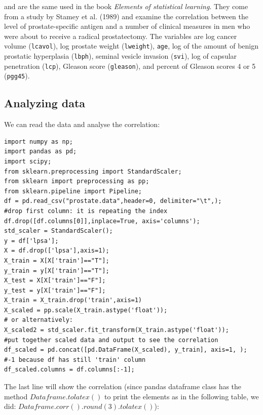 \documentclass[12pt, letterpaper]{article}
\theoremstyle{definition}
\let\ti\textit
\begin{document}
and are the same used in the book \ti{Elements of statistical learning}. They come from a study by Stamey et al. (1989) and examine the correlation between the level of prostate-specific antigen and a number of clinical measures in men who were about to receive a radical prostatectomy. The variables are log cancer volume (\lstinline[columns=fixed]{lcavol}), log prostate weight (\lstinline[columns=fixed]{lweight}), \lstinline[columns=fixed]{age}, log of the amount of benign prostatic hyperplasia (\lstinline[columns=fixed]{lbph}), seminal vesicle invasion (\lstinline[columns=fixed]{svi}), log of capsular penetration (\lstinline[columns=fixed]{lcp}), Gleason score (\lstinline[columns=fixed]{gleason}), and percent of Gleason scores 4 or 5 (\lstinline[columns=fixed]{pgg45}).

\subsection{Analyzing data}
We can read the data and analyse the correlation:

\begin{lstlisting}
import numpy as np;
import pandas as pd;
import scipy;
from sklearn.preprocessing import StandardScaler;
from sklearn import preprocessing as pp;
from sklearn.pipeline import Pipeline;
df = pd.read_csv("prostate.data",header=0, delimiter="\t",);
#drop first column: it is repeating the index
df.drop([df.columns[0]],inplace=True, axis='columns');
std_scaler = StandardScaler();
y = df['lpsa'];
X = df.drop(['lpsa'],axis=1);
X_train = X[X['train']=="T"];
y_train = y[X['train']=="T"];
X_test = X[X['train']=="F"];
y_test = y[X['train']=="F"];
X_train = X_train.drop('train',axis=1)
X_scaled = pp.scale(X_train.astype('float'));
# or alternatively:
X_scaled2 = std_scaler.fit_transform(X_train.astype('float'));
#put together scaled data and output to see the correlation
df_scaled = pd.concat([pd.DataFrame(X_scaled), y_train], axis=1, );
#-1 because df has still 'train' column
df_scaled.columns = df.columns[:-1];
\end{lstlisting}
The last line will show the correlation (since pandas dataframe class has the method $Dataframe.tolatex()$ to print the elements as in the following table, we did: $Dataframe.corr().round(3).tolatex()$):
\end{document}
